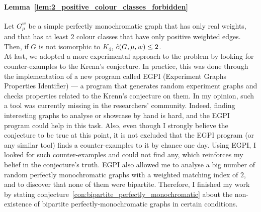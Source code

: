 \paragraph{Lemma~\ref{lem:2_positive_colour_classes_forbidden}}
Let $G_\mu^w$ be a simple perfectly monochromatic graph that has only real weights, and that has at least $2$ colour classes that have only positive weighted edges.
Then, if $G$ is not isomorphic to $K_4$, $\Tilde{c}(G, \mu, w) \leq 2$.\\


At last, we adopted a more experimental approach to the problem by looking for counter-examples to the Krenn's conjecture.
In practice, this was done through the implementation of a new program called EGPI (Experiment Graphs Properties Identifier) — a program that generates random experiment graphs and checks properties related to the Krenn's conjecture on them.
In my opinion, such a tool was currently missing in the researchers' community.
Indeed, finding interesting graphs to analyse or showcase by hand is hard, and the EGPI program could help in this task.
Also, even though I strongly believe the conjecture to be true at this point, it is not excluded that the EGPI program (or any similar tool) finds a counter-examples to it by chance one day.
Using EGPI, I looked for such counter-examples and could not find any, which reinforces my belief in the conjecture's truth.
EGPI also allowed me to analyse a big number of random perfectly monochromatic graphs with a weighted matching index of $2$, and to discover that none of them were bipartite.
Therefore, I finished my work by stating conjecture~\ref{con:bipartite_perfectly_monochromatic} about the non-existence of bipartite perfectly-monochromatic graphs in certain conditions.\\
